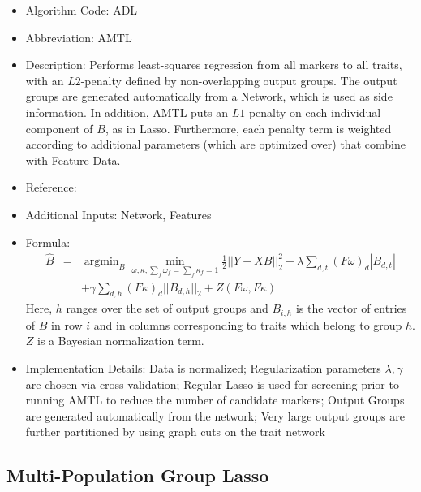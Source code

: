 \documentclass{article}
\newcommand{\argmin}{\operatorname{argmin}}
\begin{document}
\begin{itemize}
\item Algorithm Code: ADL
\item Abbreviation: AMTL
\item Description: Performs least-squares regression from all markers to all traits, with an $L2$-penalty defined by non-overlapping output groups. The output groups are generated automatically from a Network, which is used as side information. In addition, AMTL puts an $L1$-penalty on each individual component of $B$, as in Lasso. Furthermore, each penalty term is weighted according to additional parameters (which are optimized over) that combine with Feature Data.
\item Reference: \cite{TreeLasso}
\item Additional Inputs: Network, Features
\item Formula:
\begin{eqnarray*}
\hat{B} &=& \argmin_{B} \min_{\omega, \kappa, \sum_f \omega_f = \sum_f \kappa_f = 1} \frac{1}{2}||Y - XB||_2^2 + \lambda \sum_{d,t}(F\omega)_d|B_{d,t}|\\
&& + \gamma \sum_{d,h}(F\kappa)_d||B_{d,h}||_2 + Z(F\omega, F\kappa)
\end{eqnarray*}
Here, $h$ ranges over the set of output groups and $B_{i,h}$ is the vector of entries of $B$ in row $i$ and in columns corresponding to traits which belong to group $h$. $Z$ is a Bayesian normalization term.
\item Implementation Details: Data is normalized; Regularization parameters $\lambda, \gamma$ are chosen via cross-validation; Regular Lasso is used for screening prior to running AMTL to reduce the number of candidate markers; Output Groups are generated automatically from the network; Very large output groups are further partitioned by using graph cuts on the trait network
\end{itemize}

\subsection{Multi-Population Group Lasso}
\end{document}
